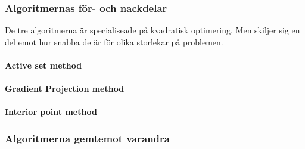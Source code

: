 \subsubsection{Algoritmernas för- och nackdelar}
De tre algoritmerna är specialiseade på kvadratisk optimering. Men skiljer sig en del emot hur snabba de är för olika storlekar på problemen.

\paragraph{Active set method}

\paragraph{Gradient Projection method}


\paragraph{Interior point method}


\subsubsection{Algoritmerna gemtemot varandra}
